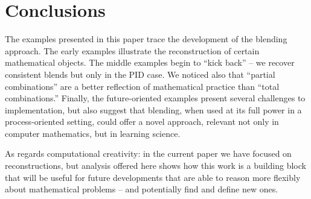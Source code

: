 \section{Conclusions}
\label{sec:conc}

The examples presented in this paper trace the development of the
blending approach.  The early examples illustrate the reconstruction
of certain mathematical objects.  The middle examples begin to ``kick
back'' -- we recover consistent blends but only in the PID case.  We
noticed also that ``partial combinations'' are a better reflection of
mathematical practice than ``total combinations.''  Finally, the
future-oriented examples present several challenges to implementation,
but also suggest that blending, when used at its full power in a
process-oriented setting, could offer a novel approach, relevant not
only in computer mathematics, but in learning science.

As regards computational creativity: in the current paper we have
focused on reconstructions, but analysis offered here shows how this
work is a building block that will be useful for future developments
that are able to reason more flexibly about mathematical problems --
and potentially find and define new ones.

